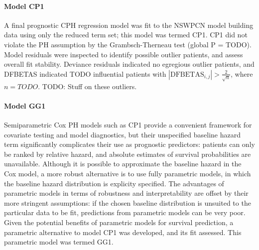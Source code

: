 \documentclass[dissertation.tex]{subfiles}
\begin{document}
\paragraph{Model CP1}
A final prognostic \acrshort{CPH} regression model was fit to the \gls{NSWPCN} model building data using only the reduced term set; this model was termed CP1.  CP1 did not violate the \gls{PH} assumption by the Grambsch-Therneau test (global P = TODO).  Model residuals were inspected to identify possible outlier patients, and assess overall fit stability.  Deviance residuals indicated no egregious outlier patients, and DFBETAS indicated TODO influential patients with $|\mbox{DFBETAS}_{i,j}| > \frac{2}{\sqrt{n}}$, where $n = TODO$.  TODO: Stuff on these outliers.

\paragraph{Model GG1}
Semiparametric Cox \gls{PH} models such as CP1 provide a convenient framework for covariate testing and model diagnostics, but their unspecified baseline hazard term significantly complicates their use as prognostic predictors: patients can only be ranked by relative hazard, and absolute estimates of survival probabilities are unavailable.  Although it is possible to approximate the baseline hazard in the Cox model, a more robust alternative is to use fully parametric models, in which the baseline hazard distribution is explicity specified.  The advantages of parametric models in terms of robustness and interpretability are offset by their more stringent assumptions: if the chosen baseline distribution is unsuited to the particular data to be fit, predictions from parametric models can be very poor.  Given the potential benefits of parametric models for survival prediction, a parametric alternative to model CP1 was developed, and its fit assessed.  This parametric model was termed GG1.
\end{document}
